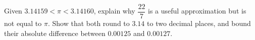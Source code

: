 Given $3.14159<\pi<3.14160$, explain why $\dfrac{22}{7}$ is a useful approximation but is not equal to $\pi$. Show that both round to $3.14$ to two decimal places, and bound their absolute difference between $0.00125$ and $0.00127$.
